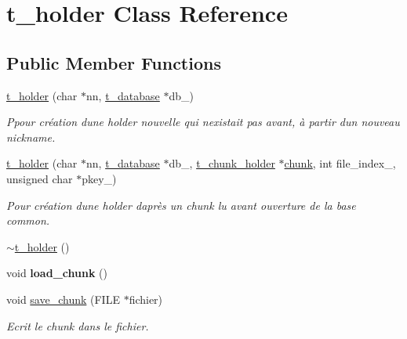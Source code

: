 \hypertarget{classt__holder}{}\section{t\+\_\+holder Class Reference}
\label{classt__holder}
\subsection*{Public Member Functions}
\begin{DoxyCompactItemize}
\item 
\hyperlink{classt__holder_aa8151374dbbb1582f0939c0dad5f50ba}{t\+\_\+holder} (char $\ast$nn, \hyperlink{classt__database}{t\+\_\+database} $\ast$db\+\_\+)
\begin{DoxyCompactList}\small\item\em Ppour création d\textquotesingle{}une holder nouvelle qui n\textquotesingle{}existait pas avant, à partir d\textquotesingle{}un nouveau nickname. \end{DoxyCompactList}\item 
\hyperlink{classt__holder_a3d8839ea25d970d538026a812d4e0e52}{t\+\_\+holder} (char $\ast$nn, \hyperlink{classt__database}{t\+\_\+database} $\ast$db\+\_\+, \hyperlink{structt__chunk__holder}{t\+\_\+chunk\+\_\+holder} $\ast$\hyperlink{classt__holder_a90ca7d49e0d605f1652d20eec3ae56e3}{chunk}, int file\+\_\+index\+\_\+, unsigned char $\ast$pkey\+\_\+)
\begin{DoxyCompactList}\small\item\em Pour création d\textquotesingle{}une holder d\textquotesingle{}après un chunk lu avant ouverture de la base common. \end{DoxyCompactList}\item 
\hyperlink{classt__holder_a361942a714f21ef8be1faba7e49e53f0}{$\sim$t\+\_\+holder} ()
\item 
\mbox{\label{classt__holder_a6390402dafe48f986eab7315d078ac5b}} 
void {\bfseries load\+\_\+chunk} ()
\item 
void \hyperlink{classt__holder_a169fe1cbdec140ea60b57286f830c2c7}{save\+\_\+chunk} (F\+I\+LE $\ast$fichier)
\begin{DoxyCompactList}\small\item\em Ecrit le chunk dans le fichier. \end{DoxyCompactList}\item 
\mbox{\label{classt__holder_a6514339448b04e75586c0313b51b90c5}} 

\end{DoxyCompactItemize}
